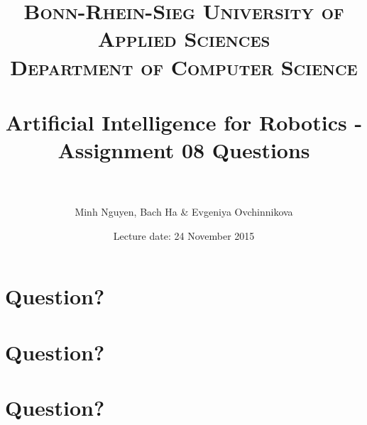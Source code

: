 \documentclass[paper=a4, fontsize=11pt]{scrartcl} %
\title{	
\normalfont \normalsize 
\textsc{Bonn-Rhein-Sieg University of Applied Sciences \\Department of Computer Science} \\ [10pt] %
\horrule{0.5pt} \\[0.4cm] %
\LARGE Artificial Intelligence for Robotics - Assignment 08 Questions \\ %
\horrule{2pt} \\[0.5cm] %
}
\author{Minh Nguyen, Bach Ha \& Evgeniya Ovchinnikova} %
\date{Lecture date: 24 November 2015}
\begin{document}
\maketitle %


\section{Question?}



\section{Question?}



\section{Question?}
\end{document}
